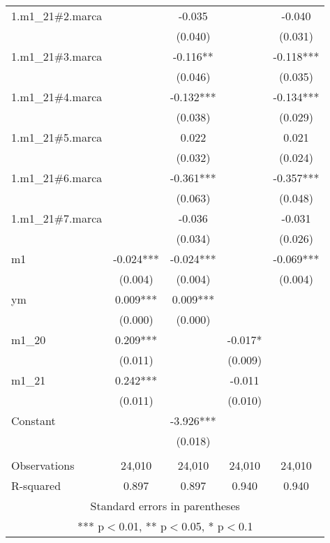\begin{tabular}{lcccc}
1.m1\_21\#2.marca &  & -0.035 &  & -0.040 \\
 &  & (0.040) &  & (0.031) \\
1.m1\_21\#3.marca &  & -0.116** &  & -0.118*** \\
 &  & (0.046) &  & (0.035) \\
1.m1\_21\#4.marca &  & -0.132*** &  & -0.134*** \\
 &  & (0.038) &  & (0.029) \\
1.m1\_21\#5.marca &  & 0.022 &  & 0.021 \\
 &  & (0.032) &  & (0.024) \\
1.m1\_21\#6.marca &  & -0.361*** &  & -0.357*** \\
 &  & (0.063) &  & (0.048) \\
1.m1\_21\#7.marca &  & -0.036 &  & -0.031 \\
 &  & (0.034) &  & (0.026) \\
m1 & -0.024*** & -0.024*** &  & -0.069*** \\
 & (0.004) & (0.004) &  & (0.004) \\
ym & 0.009*** & 0.009*** &  &  \\
 & (0.000) & (0.000) &  &  \\
m1\_20 & 0.209*** &  & -0.017* &  \\
 & (0.011) &  & (0.009) &  \\
m1\_21 & 0.242*** &  & -0.011 &  \\
 & (0.011) &  & (0.010) &  \\
Constant &  & -3.926*** &  &  \\
 &  & (0.018) &  &  \\
 &  &  &  &  \\
Observations & 24,010 & 24,010 & 24,010 & 24,010 \\
 R-squared & 0.897 & 0.897 & 0.940 & 0.940 \\ \hline
\multicolumn{5}{c}{ Standard errors in parentheses} \\
\multicolumn{5}{c}{ *** p$<$0.01, ** p$<$0.05, * p$<$0.1} \\
\end{tabular}

